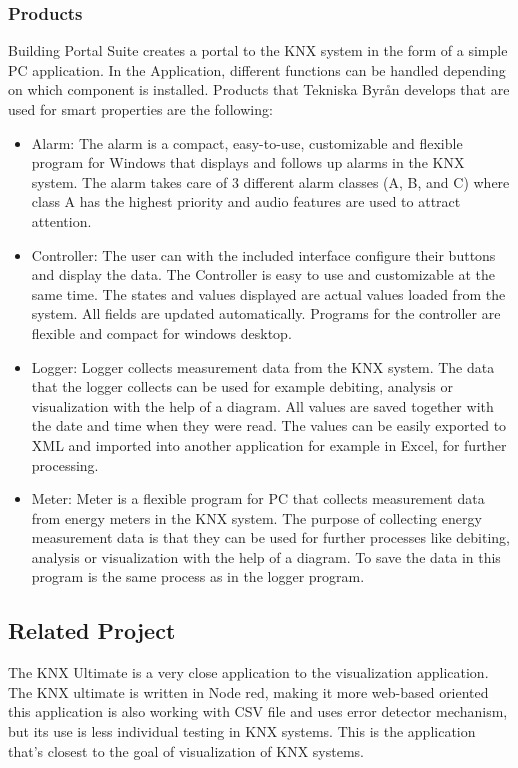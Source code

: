 \documentclass{article}
\begin{document}
\subsubsection{Products}
Building Portal Suite creates a portal to the KNX system in the form of a simple PC application. In the Application, different functions can be handled depending on which component is installed.
Products that Tekniska Byrån develops that are used for smart properties are the following:\cite{tekprod} 
\begin{itemize}
    \item Alarm: The alarm is a compact, easy-to-use, customizable and flexible program for Windows that displays and follows up alarms in the KNX system. The alarm takes care of 3 different alarm classes (A, B, and C) where class A has the highest priority and audio features are used to attract attention.\cite{tekalarm} 
    \item Controller: The user can with the included interface configure their buttons and display the data. The Controller is easy to use and customizable at the same time. The states and values displayed are actual values loaded from the system. All fields are updated automatically. Programs for the controller are flexible and compact for windows desktop.\cite{tekcontroller} 
    \item Logger: Logger collects measurement data from the KNX system. The data that the logger collects can be used for example debiting, analysis or visualization with the help of a diagram. All values are saved together with the date and time when they were read. The values can be easily exported to XML and imported into another application for example in Excel, for further processing.\cite{teklogger} 
    \item Meter: Meter is a flexible program for PC that collects measurement data from energy meters in the KNX system. The purpose of collecting energy measurement data is that they can be used for further processes like debiting, analysis or visualization with the help of a diagram. To save the data in this program is the same process as in the logger program.\cite{tekmeter} 
\end{itemize}
\subsection{Related Project}
The KNX Ultimate is a very close application to the visualization application. The KNX ultimate is written in Node red, making it more web-based oriented this application is also working with CSV file and uses error detector mechanism, but its use is less individual testing in KNX systems. This is the application that's closest to the goal of visualization of KNX systems.\cite{ultimate} 
\end{document}
